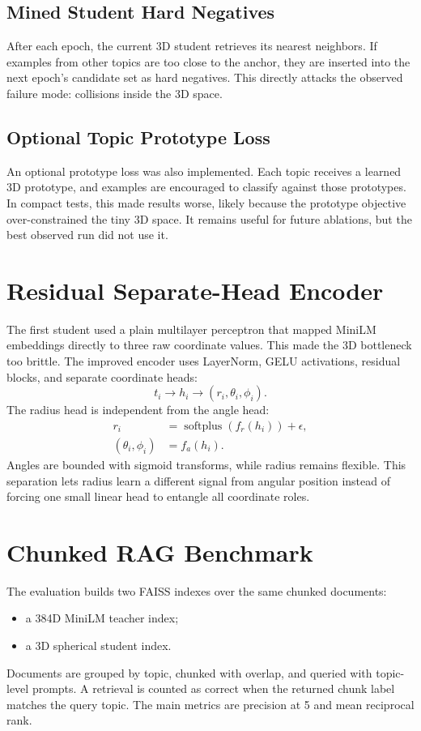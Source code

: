 \documentclass[11pt]{article}
\begin{document}
\subsection{Mined Student Hard Negatives}
After each epoch, the current 3D student retrieves its nearest neighbors. If examples from other topics are too close to the anchor, they are inserted into the next epoch's candidate set as hard negatives. This directly attacks the observed failure mode: collisions inside the 3D space.

\subsection{Optional Topic Prototype Loss}
An optional prototype loss was also implemented. Each topic receives a learned 3D prototype, and examples are encouraged to classify against those prototypes. In compact tests, this made results worse, likely because the prototype objective over-constrained the tiny 3D space. It remains useful for future ablations, but the best observed run did not use it.

\section{Residual Separate-Head Encoder}
The first student used a plain multilayer perceptron that mapped MiniLM embeddings directly to three raw coordinate values. This made the 3D bottleneck too brittle. The improved encoder uses LayerNorm, GELU activations, residual blocks, and separate coordinate heads:
\[
t_i \rightarrow h_i \rightarrow
\left(
r_i,\theta_i,\phi_i
\right).
\]
The radius head is independent from the angle head:
\begin{align}
r_i &= \operatorname{softplus}(f_r(h_i)) + \epsilon,\\
(\theta_i,\phi_i) &= f_a(h_i).
\end{align}
Angles are bounded with sigmoid transforms, while radius remains flexible. This separation lets radius learn a different signal from angular position instead of forcing one small linear head to entangle all coordinate roles.

\section{Chunked RAG Benchmark}
The evaluation builds two FAISS indexes over the same chunked documents:
\begin{itemize}
\item a 384D MiniLM teacher index;
\item a 3D spherical student index.
\end{itemize}
Documents are grouped by topic, chunked with overlap, and queried with topic-level prompts. A retrieval is counted as correct when the returned chunk label matches the query topic. The main metrics are precision at 5 and mean reciprocal rank.
\end{document}
